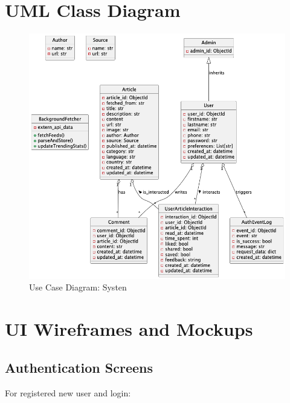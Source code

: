 \section{UML Class Diagram}\label{sec:uml-class-diagram}

\begin{figure}[!h]
    \centering
    \includegraphics[width=1\textwidth]{chapters/chapter_03/uml-class-diagram}
    \caption{Use Case Diagram: Systen}
    \label{fig:uml-class-diagram}
\end{figure}




\section{UI Wireframes and Mockups}\label{sec:ui-wireframes-and-mockups}

\subsection{Authentication Screens}\label{subsec:authentication-screens}

For registered new user and login:

